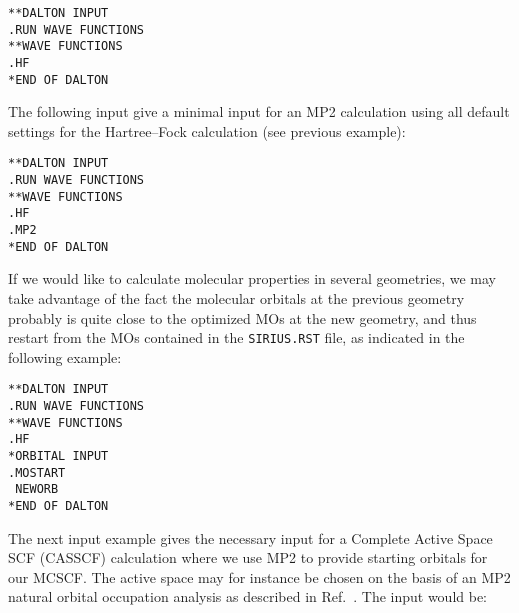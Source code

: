 \begin{verbatim}
**DALTON INPUT
.RUN WAVE FUNCTIONS
**WAVE FUNCTIONS
.HF
*END OF DALTON
\end{verbatim}
\label{sirius_ex1a}

The following input give a minimal input for an
MP2
calculation using all default settings for the Hartree--Fock
calculation (see previous example):

\begin{verbatim}
**DALTON INPUT
.RUN WAVE FUNCTIONS
**WAVE FUNCTIONS
.HF
.MP2
*END OF DALTON
\end{verbatim}
\label{sirius_ex1b}

If we would like to calculate molecular properties in several
geometries, we may take advantage of the fact the molecular
orbitals at the previous geometry probably is quite close to the
optimized MOs at the new geometry, and thus restart
from the MOs contained in the \verb|SIRIUS.RST|
file, as indicated in the following example:

\begin{verbatim}
**DALTON INPUT
.RUN WAVE FUNCTIONS
**WAVE FUNCTIONS
.HF
*ORBITAL INPUT
.MOSTART
 NEWORB
*END OF DALTON
\end{verbatim}
\label{sirius_ex2}

\begin{center}
\end{center}

The next input example gives the necessary input for a Complete
Active Space SCF (CASSCF) calculation where we use MP2 to provide
starting orbitals
for our MCSCF. The
active space may for instance be
chosen on the basis of an MP2 natural orbital occupation
analysis as
described in Ref.~\cite{hjajpjhajojcp88}. The input would be:

